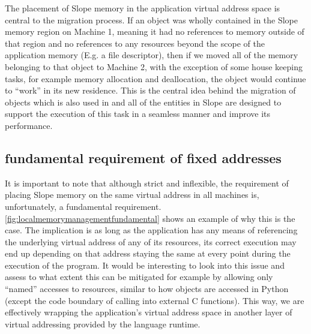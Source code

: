The placement of Slope memory in the application virtual address space is
central to the migration process.  If an object was wholly contained
in the Slope memory region on Machine 1, meaning it had no references to memory
outside
of that region and no references to any resources beyond the
scope of the application memory (E.g. a file descriptor), then if we moved all
of the memory belonging to that object to Machine 2, with the exception of
some house keeping tasks, for example memory allocation and deallocation, the
object would continue to ``work'' in its new residence.
This is the central
idea behind the migration of objects which is also used in \cite{memon2018ramp}
and all of the entities in Slope are designed
to support the execution of this task in a seamless manner and improve its
performance.

\subsection{fundamental requirement of fixed addresses}
\label{sec:fixedfundamental}
It is important to note that although strict and inflexible, the requirement of
placing Slope memory on the same virtual address in all machines is,
unfortunately, a fundamental requirement. \autoref{fig:localmemorymanagementfundamental}
shows an example of why this is the case. The implication is as long as the
application has any means of referencing the underlying virtual address of any
of its resources, its correct execution may end up depending on that address
staying the same at every point during the execution of the program. It would
be interesting to look into this issue and assess to what extent this can be
mitigated for example by allowing only ``named'' accesses to resources, similar
to how objects are accessed in Python (except the code boundary of calling into
external C functions). This way, we are effectively wrapping the application's
virtual address space in another layer of virtual addressing provided by the
language runtime.


